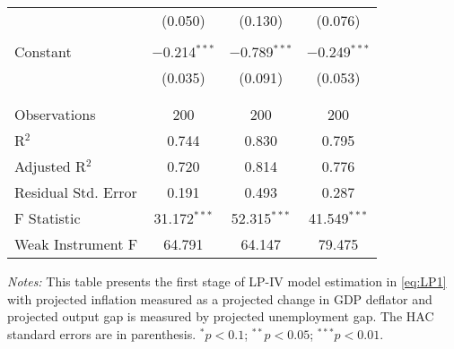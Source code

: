 \documentclass[11pt]{article}
\begin{document}
\begin{table}[!htbp]
\begin{threeparttable}
\begin{tabular}{@{\extracolsep{5pt}}lccc}
      & (0.050) & (0.130) & (0.076) \\ 
      & & & \\ 
     Constant & $-$0.214$^{***}$ & $-$0.789$^{***}$ & $-$0.249$^{***}$ \\ 
      & (0.035) & (0.091) & (0.053) \\ 
      & & & \\ 
    \hline \\[-1.8ex] 
    Observations & 200 & 200 & 200 \\ 
    R$^{2}$ & 0.744 & 0.830 & 0.795 \\ 
    Adjusted R$^{2}$ & 0.720 & 0.814 & 0.776 \\ 
    Residual Std. Error & 0.191 & 0.493 & 0.287 \\ 
    F Statistic & 31.172$^{***}$ & 52.315$^{***}$ & 41.549$^{***}$ \\ 
    Weak Instrument F& 64.791& 64.147& 79.475 \\
    \hline 
    \hline 
    \end{tabular} 
    \begin{tablenotes}[flushleft]
      \item[]\textit{Notes:} This table presents the first stage of LP-IV model estimation in \vref{eq:LP1} with projected inflation measured as a projected change in GDP deflator and projected output gap is measured by projected unemployment gap. The \citet{Andrews1991} HAC standard errors are in parenthesis. $^{*}p<0.1$; $^{**}p<0.05$; $^{***}p<0.01$.
    \end{tablenotes}
  \end{threeparttable}
    \end{table} 




\newpage









\end{document}
